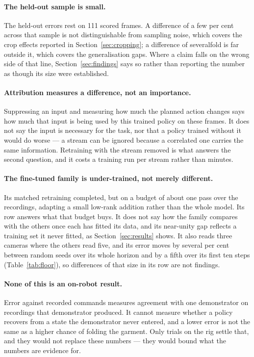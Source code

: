 \paragraph{The held-out sample is small.}
The held-out errors rest on \num{111} scored frames. A difference of a few per
cent across that sample is not distinguishable from sampling noise, which
covers the crop effects reported in Section~\ref{sec:cropping}; a difference of
severalfold is far outside it, which covers the generalisation gaps. Where a
claim falls on the wrong side of that line, Section~\ref{sec:findings} says so
rather than reporting the number as though its size were established.

\paragraph{Attribution measures a difference, not an importance.}
Suppressing an input and measuring how much the planned action changes says how
much that input is being used by this trained policy on these frames. It does
not say the input is necessary for the task, nor that a policy trained without
it would do worse --- a stream can be ignored because a correlated one carries
the same information. Retraining with the stream removed is what answers the
second question, and it costs a training run per stream rather than minutes.

\paragraph{The fine-tuned family is under-trained, not merely different.}
Its matched retraining completed, but on a budget of about one pass over the
recordings, adapting a small low-rank addition rather than the whole model.
Its row answers what that budget buys. It does not say how the family compares
with the others once each has fitted its data, and its near-unity gap reflects
a training set it never fitted, as Section~\ref{sec:results} shows. It also
reads three cameras where the others read five, and its error moves by several
per cent between random seeds over its whole horizon and by a fifth over its
first ten steps (Table~\ref{tab:floor}), so differences of that size in its
row are not findings.

\paragraph{None of this is an on-robot result.}
Error against recorded commands measures agreement with one demonstrator on
recordings that demonstrator produced. It cannot measure whether a policy
recovers from a state the demonstrator never entered, and a lower error is not
the same as a higher chance of folding the garment. Only trials on the rig
settle that, and they would not replace these numbers --- they would bound what
the numbers are evidence for.
